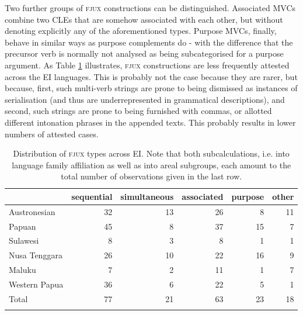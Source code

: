 Two further groups of \textsc{fjux} constructions can be distinguished. Associated MVCs combine two CLEs that are somehow associated with each other, but without denoting explicitly any of the aforementioned types. Purpose MVCs, finally, behave in similar ways as purpose complements do - with the difference that the precursor verb is normally not analysed as being subcategorised for a purpose argument. As Table \ref{table:FJUX_overview} illustrates, \textsc{fjux} constructions are less frequently attested across the EI languages. This is probably not the case because they are rarer, but because, first, such multi-verb strings are prone to being dismissed as instances of serialisation (and thus are underrepresented in grammatical descriptions), and second, such strings are prone to being furnished with commas, or allotted different intonation phrases in the appended texts. This probably results in lower numbers of attested cases.

\begin{table}
\begin{tabular}{lrrrrr}
  \lsptoprule
 & {sequential} & {simultaneous} & {associated} & {purpose} & {other} \\  
  \midrule
  Austronesian & 32 & 13 & 26 & 8 & 11 \tabularnewline
  Papuan & 45 & 8 & 37 &  15 & 7 \tabularnewline
   \midrule
  Sulawesi & 8 & 3 & 8 & 1 & 1 \tabularnewline
  Nusa Tenggara & 26 & 10 & 22 & 16 & 9 \tabularnewline
  Maluku & 7 & 2 & 11 & 1 & 7 \tabularnewline 
  Western Papua & 36 & 6 & 22 & 5 & 1 \tabularnewline 
\lsptoprule
Total & 77 & 21 & 63 & 23 & 18 \tabularnewline
\lspbottomrule
\end{tabular}
\caption[Distribution of \textsc{fjux} types across EI]{Distribution of \textsc{fjux} types across EI. Note that both subcalculations, i.e. into language family affiliation as well as into areal subgroups, each amount to the total number of observations given in the last row.}
\label{table:FJUX_overview}
\end{table}

